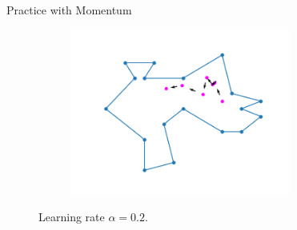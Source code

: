 \documentclass{beamer}
\begin{document}
\begin{frame}[noframenumbering]{Practice with Momentum}
\begin{figure}[h!]
\begin{subfigure}{0.4\textwidth}
			\caption{}
			\label{fig:comb_gradient}
		\end{subfigure}
		\begin{subfigure}{0.4\textwidth}
			\centering
			\includegraphics[width = 0.8\textwidth]{Images/random_momentum.png}
			\caption{}
			\label{fig:random_gradient}
		\end{subfigure}
		\caption{Learning rate $\alpha = 0.2$.}
		\label{fig:gradients}
	\end{figure}
\end{frame}





\end{document}
